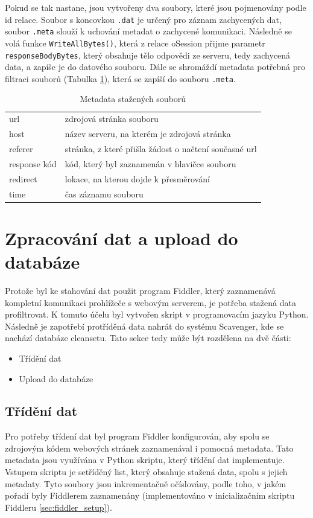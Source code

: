 \documentclass[thesis=M,czech,hidelinks]{FITthesis}[2013/05/06]
\begin{document}
Pokud se tak nastane, jsou vytvořeny dva soubory, které jsou pojmenovány podle id relace. Soubor s koncovkou \texttt{.dat} je určený pro záznam zachycených dat, soubor \texttt{.meta} slouží k uchování metadat o zachycené komunikaci. Následně se volá funkce \texttt{WriteAllBytes()}, která z relace oSession přijme parametr \texttt{responseBodyBytes}, který obsahuje tělo odpovědi ze serveru, tedy zachycená data, a zapíše je do datového souboru. Dále se shromáždí metadata potřebná pro filtraci souborů (Tabulka \ref{fig:meta}), která se zapíší do souboru \texttt{.meta}. 


\begin{table}[h]
	
	\centering
	\begin{tabular}{ll}
		url         	&  zdrojová stránka souboru \\
		host        	&  název serveru, na kterém je zdrojová stránka \\
		referer       	&  stránka, z které přišla žádost o načtení současné url \\
		response kód   	&  kód, který byl zaznamenán v hlavičce souboru  \\
		redirect		&  lokace, na kterou dojde k přesměrování \\
		time			&  čas záznamu souboru
	\end{tabular}
	
	\caption{Metadata stažených souborů}
	\label{fig:meta}
\end{table}



\section{Zpracování dat a upload do databáze}
Protože byl ke stahování dat použit program Fiddler, který zaznamenává kompletní komunikaci prohlížeče s webovým serverem, je potřeba stažená data profiltrovat. K tomuto účelu byl vytvořen skript v programovacím jazyku Python. Následně je zapotřebí protříděná data nahrát do systému Scavenger, kde se nachází databáze cleansetu. Tato sekce tedy může být rozdělena na dvě části:
\begin{itemize}
	\item Třídění dat
	\item Upload do databáze
\end{itemize}



\subsection{Třídění dat}\label{sec:trideni}
Pro potřeby třídení dat byl program Fiddler konfigurován, aby spolu se zdrojovým kódem webových stránek zaznamenával i pomocná metadata. Tato metadata jsou využívána v Python skriptu, který třídění dat implementuje. Vstupem skriptu je setříděný list, který obsahuje stažená data, spolu s jejich metadaty. Tyto soubory jsou inkrementačně očíslovány, podle toho, v jakém pořadí byly Fiddlerem zaznamenány (implementováno v inicializačním skriptu Fiddleru \ref{sec:fiddler_setup}).
\end{document}
